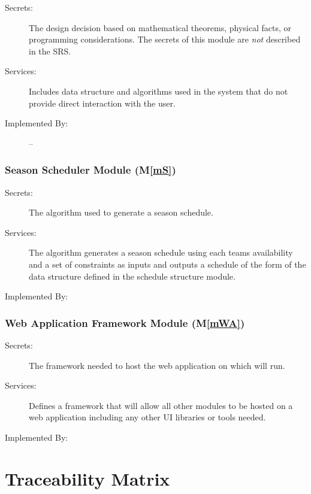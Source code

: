 \documentclass[12pt, titlepage]{article}
\newcommand{\mref}[1]{M\ref{#1}}
\begin{document}
\begin{description}
  \item[Secrets:] The design decision based on mathematical theorems, physical
    facts, or programming considerations. The secrets of this module are
    \emph{not} described in the SRS.
  \item[Services:] Includes data structure and algorithms used in the system that
    do not provide direct interaction with the user. 
  \item[Implemented By:] --
\end{description}

\subsubsection{Season Scheduler Module (\mref{mS})}

\begin{description}
  \item[Secrets:]The algorithm used to generate a season schedule.
  \item[Services:]The algorithm generates a season schedule using each teams
  availability and a set of constraints as inputs and outputs a schedule of
  the form of the data structure defined in the schedule structure module.
  \item[Implemented By:] \progname{}
\end{description}

\subsubsection{Web Application Framework Module (\mref{mWA})}

\begin{description}
  \item[Secrets:]The framework needed to host the web application on which
  \progname{} will run.
  \item[Services:]Defines a framework that will allow all other modules to be
  hosted on a web application including any other UI libraries or tools
  needed.
  \item[Implemented By:] \progname{}
\end{description}

\section{Traceability Matrix} \label{SecTM}
\end{document}
